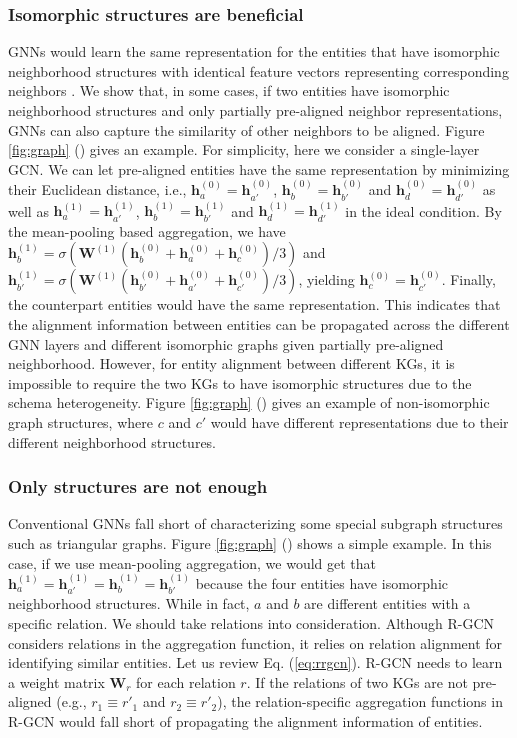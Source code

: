 \documentclass[letterpaper]{article} \usepackage{aaai20}  \usepackage{times}  \usepackage{helvet} \usepackage{courier}  \usepackage[hyphens]{url}  \usepackage{graphicx} \urlstyle{rm} \def\UrlFont{\rm}  \frenchspacing  \setlength{\pdfpagewidth}{8.5in}  \setlength{\pdfpageheight}{11in}  \usepackage{amsmath}
\begin{document}
\subsubsection{Isomorphic structures are beneficial}
GNNs would learn the same representation for the entities that have isomorphic neighborhood structures with identical feature vectors representing corresponding neighbors \cite{PowerGCN}. We show that, in some cases, if two entities have isomorphic neighborhood structures and only partially pre-aligned neighbor representations, GNNs can also capture the similarity of other neighbors to be aligned. Figure \ref{fig:graph} () gives an example. For simplicity, here we consider a single-layer GCN. We can let pre-aligned entities have the same representation by minimizing their Euclidean distance, i.e., $\mathbf{h}_a^{(0)}=\mathbf{h}_{a'}^{(0)}$, $\mathbf{h}_b^{(0)}=\mathbf{h}_{b'}^{(0)}$ and $\mathbf{h}_d^{(0)}=\mathbf{h}_{d'}^{(0)}$ as well as $\mathbf{h}_a^{(1)}=\mathbf{h}_{a'}^{(1)}$, $\mathbf{h}_b^{(1)}=\mathbf{h}_{b'}^{(1)}$ and $\mathbf{h}_d^{(1)}=\mathbf{h}_{d'}^{(1)}$ in the ideal condition. By the mean-pooling based aggregation, we have $\mathbf{h}_b^{(1)}= \sigma(\mathbf{W}^{(1)}(\mathbf{h}_b^{(0)}+\mathbf{h}_a^{(0)}+\mathbf{h}_c^{(0)})/3) $ and $\mathbf{h}_{b'}^{(1)}= \sigma(\mathbf{W}^{(1)}(\mathbf{h}_{b'}^{(0)}+\mathbf{h}_{a'}^{(0)}+\mathbf{h}_{c'}^{(0)})/3) $, yielding $\mathbf{h}_c^{(0)}=\mathbf{h}_{c'}^{(0)}$. Finally, the counterpart entities would have the same representation. This indicates that the alignment information between entities can be propagated across the different GNN layers and different isomorphic graphs given partially pre-aligned neighborhood. However, for entity alignment between different KGs, it is impossible to require the two KGs to have isomorphic structures due to the schema heterogeneity. Figure \ref{fig:graph} () gives an example of non-isomorphic graph structures, where $c$ and $c'$ would have different representations due to their different neighborhood structures. 

\subsubsection{Only structures are not enough} Conventional GNNs fall short of characterizing  some special subgraph structures such as triangular graphs. Figure \ref{fig:graph} () shows a simple example. In this case, if we use mean-pooling aggregation, we would get that $\mathbf{h}_a^{(1)}=\mathbf{h}_{a'}^{(1)}=\mathbf{h}_b^{(1)}=\mathbf{h}_{b'}^{(1)}$ because the four entities have isomorphic neighborhood structures. While in fact, $a$ and $b$ are different entities with a specific relation. We should take relations into consideration. Although R-GCN \cite{R-GCN} considers relations in the aggregation function, it relies on relation alignment for identifying similar entities. Let us review Eq. (\ref{eq:rrgcn}). R-GCN needs to learn a weight matrix $\mathbf{W}_r$ for each relation $r$. If the relations of two KGs are not pre-aligned (e.g., $r_1 \equiv r'_1$ and $r_2 \equiv r'_2$), the relation-specific aggregation functions in R-GCN would fall short of propagating the alignment information of entities.
\end{document}
